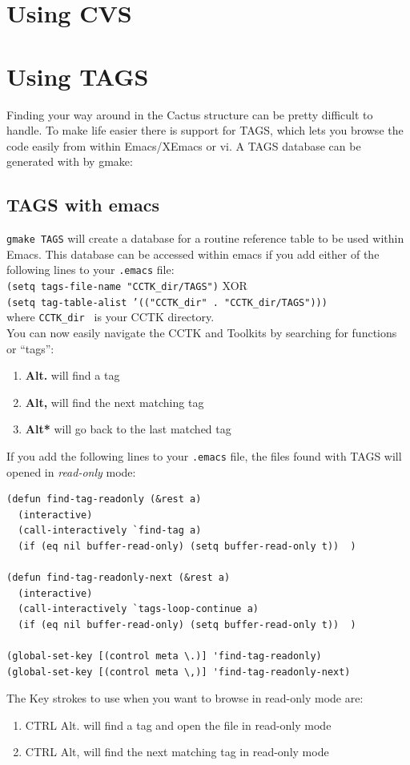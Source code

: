 \chapter{Using CVS}

\chapter{Using TAGS}
Finding your way around in the Cactus structure can be pretty
difficult to handle. To make life easier there is support for TAGS,
which lets you browse the code easily from within Emacs/XEmacs or vi. 
A TAGS database can be generated with by gmake:

 \section{TAGS with emacs}
{\tt gmake TAGS} will create a database for a routine reference
table to be used within Emacs. This database can be accessed within
emacs if you add either of the following lines to your {\tt .emacs} file:\\
{\tt (setq tags-file-name "CCTK\_dir/TAGS")} XOR \\
{\tt (setq tag-table-alist '(("CCTK\_dir" . "CCTK\_dir/TAGS")))}\\
where {\tt CCTK\_dir } is your CCTK directory.\\

You can now easily navigate the CCTK and Toolkits by searching for
functions or ``tags'':
\begin{enumerate}
\item \textbf{ Alt.} will find a tag
\item \textbf{ Alt,} will find the next matching tag
\item \textbf{ Alt*} will go back to the last matched tag
\end{enumerate}
If you add the following lines to your {\tt .emacs} file, the
files found with TAGS will opened in {\em read-only} mode:
\begin{verbatim}
(defun find-tag-readonly (&rest a)
  (interactive)
  (call-interactively `find-tag a)
  (if (eq nil buffer-read-only) (setq buffer-read-only t))  )

(defun find-tag-readonly-next (&rest a)
  (interactive)
  (call-interactively `tags-loop-continue a)
  (if (eq nil buffer-read-only) (setq buffer-read-only t))  )

(global-set-key [(control meta \.)] 'find-tag-readonly)
(global-set-key [(control meta \,)] 'find-tag-readonly-next)
\end{verbatim}
The Key strokes to use when you want to browse in read-only mode are:
\begin{enumerate}
\item{CTRL Alt.} will find a tag and open the file in read-only mode
\item{CTRL Alt,} will find the next matching tag in read-only mode
\end{enumerate}

